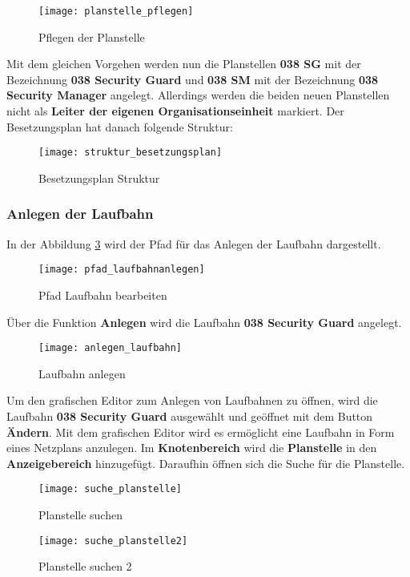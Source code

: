 \begin{figure}[H]
	\centering
	\texttt{[image: planstelle\_pflegen]}
	\caption{Pflegen der Planstelle}
	\label{fig:planstelle_pflegen}
\end{figure}

Mit dem gleichen Vorgehen werden nun die Planstellen \textbf{038 SG} mit der Bezeichnung \textbf{038 Security Guard} und \textbf{038 SM} mit der Bezeichnung \textbf{038 Security Manager} angelegt. Allerdings werden die beiden neuen Planstellen nicht als \textbf{Leiter der eigenen Organisationseinheit} markiert. Der Besetzungsplan hat danach folgende Struktur:

\begin{figure}[H]
	\centering
	\texttt{[image: struktur\_besetzungsplan]}
	\caption{Besetzungsplan Struktur}
	\label{fig:struktur_besetzungsplan}
\end{figure}

\subsubsection{Anlegen der Laufbahn}
In der Abbildung \ref{fig:pfad_laufbahnanlegen} wird der Pfad für das Anlegen der Laufbahn dargestellt.

\begin{figure}[H]
	\centering
	\texttt{[image: pfad\_laufbahnanlegen]}
	\caption{Pfad Laufbahn bearbeiten}
	\label{fig:pfad_laufbahnanlegen}
\end{figure}

Über die Funktion \textbf{Anlegen} wird die Laufbahn \textbf{038 Security Guard} angelegt.

\begin{figure}[H]
	\centering
	\texttt{[image: anlegen\_laufbahn]}
	\caption{Laufbahn anlegen}
	\label{fig:anlegen_laufbahn}
\end{figure}

Um den grafischen Editor zum Anlegen von Laufbahnen zu öffnen, wird die Laufbahn \textbf{038 Security Guard} ausgewählt und geöffnet mit dem Button \textbf{Ändern}. Mit dem grafischen Editor wird es ermöglicht eine Laufbahn in Form eines Netzplans anzulegen. Im \textbf{Knotenbereich} wird die \textbf{Planstelle} in den \textbf{Anzeigebereich} hinzugefügt. Daraufhin öffnen sich die Suche für die Planstelle.

\begin{figure}[H]
	\centering
	\texttt{[image: suche\_planstelle]}
	\caption{Planstelle suchen}
	\label{fig:suche_planstelle}
\end{figure}
\begin{figure}[H]
	\centering
	\texttt{[image: suche\_planstelle2]}
	\caption{Planstelle suchen 2}
	\label{fig:suche_planstelle2}
\end{figure}

